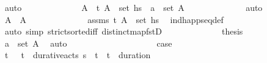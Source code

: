 \begin{isabellebody}
\ auto\isanewline
\ \ \ \ \ \ \ \ \ \ \isamarkupfalse%
\ \isamarkupfalse%
\ A{\isacharprime}{\kern0pt}\ \ {\isachardoublequoteopen}{\isacharparenleft}{\kern0pt}t{\isacharcomma}{\kern0pt}\ A{\isacharprime}{\kern0pt}{\isacharparenright}{\kern0pt}\ {\isasymin}\ set\ hs{\isachardoublequoteclose}\ \ {\isachardoublequoteopen}a\ {\isasymin}\ set\ A{\isacharprime}{\kern0pt}{\isachardoublequoteclose}\isanewline
\ \ \ \ \ \ \ \ \ \ \ \ \isamarkupfalse%
\ auto\isanewline
\ \ \ \ \ \ \ \ \ \ \isamarkupfalse%
\ {\isachardoublequoteopen}A\ {\isacharequal}{\kern0pt}\ A{\isacharprime}{\kern0pt}{\isachardoublequoteclose}\isanewline
\ \ \ \ \ \ \ \ \ \ \ \ \isamarkupfalse%
\ assms\ {\isacartoucheopen}{\isacharparenleft}{\kern0pt}t{\isacharcomma}{\kern0pt}\ A{\isacharprime}{\kern0pt}{\isacharparenright}{\kern0pt}\ {\isasymin}\ set\ hs{\isacartoucheclose}\ \isamarkupfalse%
\ ind{\isacharunderscore}{\kern0pt}happ{\isacharunderscore}{\kern0pt}seq{\isacharunderscore}{\kern0pt}def\isanewline
\ \ \ \ \ \ \ \ \ \ \ \ \isamarkupfalse%
\ {\isacharparenleft}{\kern0pt}auto\ simp{\isacharcolon}{\kern0pt}\ strict{\isacharunderscore}{\kern0pt}sorted{\isacharunderscore}{\kern0pt}iff\ distinct{\isacharunderscore}{\kern0pt}map{\isacharunderscore}{\kern0pt}fstD{\isacharparenright}{\kern0pt}\isanewline
\ \ \ \ \ \ \ \ \ \ \isamarkupfalse%
\ \isamarkupfalse%
\ {\isacharquery}{\kern0pt}thesis\isanewline
\ \ \ \ \ \ \ \ \ \ \ \ \isamarkupfalse%
\ {\isacartoucheopen}a\ {\isasymin}\ set\ A{\isacharprime}{\kern0pt}{\isacartoucheclose}\ \isamarkupfalse%
\ auto\isanewline
\ \ \ \ \ \ \ \ \isamarkupfalse%
\isanewline
\ \ \ \ \ \ \ \ \ \ \isamarkupfalse%
\ {\isacharquery}{\kern0pt}case{}\isanewline
\ \ \ \ \ \ \ \ \ \ \isamarkupfalse%
\ \isamarkupfalse%
\ t{\isacharprime}{\kern0pt}\ {\isasympi}\ \ {\isachardoublequoteopen}{\isacharparenleft}{\kern0pt}t{\isacharprime}{\kern0pt}{\isacharcomma}{\kern0pt}{\isasympi}{\isacharparenright}{\kern0pt}\ {\isasymin}\ durative{\isacharunderscore}{\kern0pt}acts\ {\isasympi}s{\isachardoublequoteclose}\ \ {\isachardoublequoteopen}t\ {\isacharequal}{\kern0pt}\ t{\isacharprime}{\kern0pt}\ {\isacharplus}{\kern0pt}\ duration\ {\isasympi}{\isachardoublequoteclose}\ \isanewline

\end{isabellebody}
